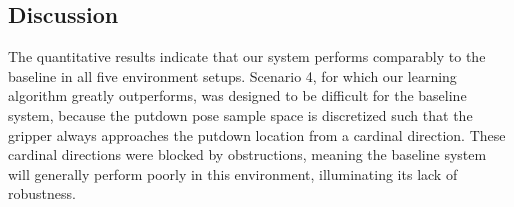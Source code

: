 \subsection{Discussion}
The quantitative results indicate that our system performs comparably to
the baseline in all five environment setups. Scenario 4, for which our learning
algorithm greatly outperforms, was designed to
be difficult for the baseline system, because the putdown pose sample space
is discretized such that the gripper always approaches the putdown location from a
cardinal direction. These cardinal directions were blocked by obstructions,
meaning the baseline system will generally perform poorly in this environment,
illuminating its lack of robustness.